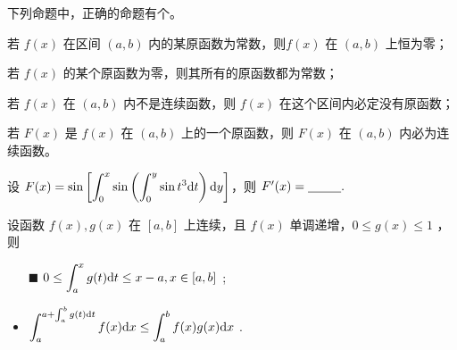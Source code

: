\begin{quest}[C3T2]
    下列命题中，正确的命题有\qline 个。
    \begin{BulletItemize}
        \item[ \textbullet  ] 若 $ f(x) $ 在区间 $ (a,b) $ 内的某原函数为常数，则$ f(x) $ 在 $ (a,b) $ 上恒为零；
        \item[ \textbullet  ] 若 $ f(x) $ 的某个原函数为零，则其所有的原函数都为常数；
        \item[ \textbullet  ] 若 $ f(x) $ 在 $ (a,b) $ 内不是连续函数，则 $ f(x) $ 在这个区间内必定没有原函数；
        \item[ \textbullet  ] 若 $ F(x) $ 是 $ f(x) $ 在 $ (a,b) $ 上的一个原函数，则 $ F(x) $ 在 $ (a,b) $ 内必为连续函数。
    \end{BulletItemize}
\end{quest}

\begin{quest}[C3T13]
    设 $\displaystyle F(x) = \sin\left[\int_0^x\sin\left(\int_0^y\sin t^3 \mathrm{d}t\right)\mathrm{d}y\right] $，则
    $ F'(x) =\underline{~~~~~~~~}. $  
\end{quest}

\begin{quest}[C3T21]
    设函数 $ f(x),g(x) $ 在 $ [a,b] $ 上连续，且 $ f(x) $ 单调递增，$ 0\leq g(x)\leq 1 $ ，则
    \begin{itemize}
        \item[$ \blacksquare $ ] $ \displaystyle 0\leq \int_a^xg(t)\mathrm{d}t\leq x-a,x\in[a,b] $ ;
        \item $ \displaystyle \int_a^{a+\int_a^bg(t)\mathrm{d}t}f(x)\mathrm{d}x\leq \int_a^b f(x)g(x)\mathrm{d}x $ .
    \end{itemize}
\end{quest}
